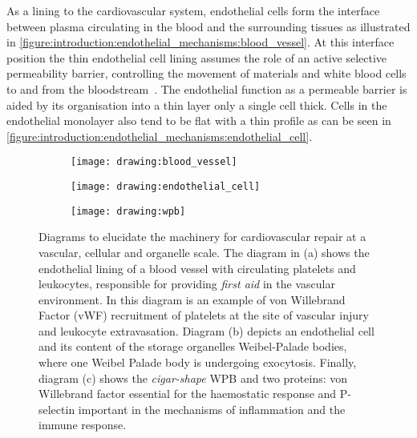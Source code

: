 As a lining to the cardiovascular system, endothelial cells form the interface between plasma circulating in the blood and the surrounding tissues as illustrated in \autoref{figure:introduction:endothelial_mechanisms:blood_vessel}. At this interface position the thin endothelial cell lining assumes the role of an active selective permeability barrier, controlling the movement of materials and white blood cells to and from the bloodstream~\cite{Alberts2002}. The endothelial function as a permeable barrier is aided by its organisation into a thin layer only a single cell thick. Cells in the endothelial monolayer also tend to be flat with a thin profile as can be seen in \autoref{figure:introduction:endothelial_mechanisms:endothelial_cell}.

\begin{figure}[htbp]\centering
\begin{minipage}{0.49\textwidth}
	\begin{subfigure}[b]{\linewidth}
		\centering
		\texttt{[image: drawing:blood\_vessel]}
		\caption{}
		\label{figure:introduction:endothelial_mechanisms:blood_vessel}
		\vspace{1ex}
	\end{subfigure}
\end{minipage}
\begin{minipage}{0.49\textwidth}
	\begin{subfigure}[b]{\linewidth}
		\centering
		\texttt{[image: drawing:endothelial\_cell]}
		\caption{}
		\label{figure:introduction:endothelial_mechanisms:endothelial_cell}
		\vspace{10.5ex}
	\end{subfigure}
	\begin{subfigure}[b]{\linewidth}
		\centering
		\texttt{[image: drawing:wpb]}
		\caption{}
		\label{figure:introduction:endothelial_mechanisms:wpb}
		\vspace{1ex}
	\end{subfigure}
\end{minipage}
\caption[Endothelial mechanisms for cardiovascular repair at a vascular, cellular and organelle scale]{Diagrams to elucidate the machinery for cardiovascular repair at a vascular, cellular and organelle scale. The diagram in (a) shows the endothelial lining of a blood vessel with circulating platelets and leukocytes, responsible for providing \emph{first aid} in the vascular environment. In this diagram is an example of von Willebrand Factor (vWF) recruitment of platelets at the site of vascular injury and leukocyte extravasation.  Diagram (b) depicts an endothelial cell and its content of the storage organelles Weibel-Palade bodies, where one Weibel Palade body is undergoing exocytosis. Finally, diagram (c) shows the \emph{cigar-shape} WPB and two proteins: von Willebrand factor essential for the haemostatic response and P-selectin important in the mechanisms of inflammation and the immune response.}
\label{figure:endothelial_mechanisms}
\end{figure}

